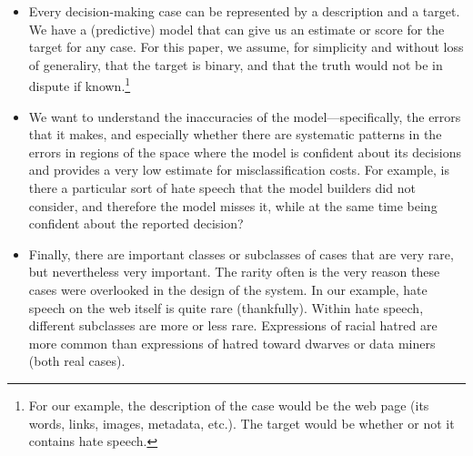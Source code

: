 \begin{itemize}
\itemsep=0.0in
\item Every decision-making case can be represented by a description
  and a target.  We have a (predictive) model that can give us an estimate or
  score for the target for any case.  For this paper, we assume, for
  simplicity and without loss of generaliry, that the target is binary, and that the truth would not
  be in dispute if known.\footnote{For our example, the
  description of the case would be the web page (its words, links,
  images, metadata, etc.).  The target would be whether or not it
  contains hate speech.}

\item We want to understand the inaccuracies of the
  model---specifically, the errors that it makes, and especially
  whether there are systematic patterns in the errors in regions of the 
  space where the model is confident about its decisions and provides a very 
  low estimate for misclassification costs.  For example,
  is there a particular sort of hate speech that the model builders
  did not consider, and therefore the model misses it, while at the same
  time being confident about the reported decision?




\item Finally, there are important classes or subclasses of cases that
  are very rare, but nevertheless very important.  The rarity often is
  the very reason these cases were overlooked in the design of the
  system.  In our example, hate speech on the web itself is quite
  rare (thankfully).  Within hate speech, different subclasses are
  more or less rare.  Expressions of racial hatred are more common
  than expressions of hatred toward dwarves or data miners (both real cases).

\end{itemize}

